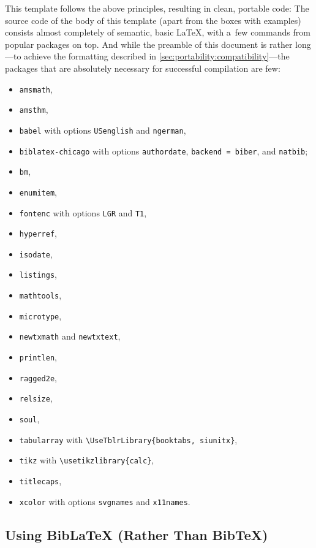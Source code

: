 \documentclass[11pt, a4paper, oneside]{article}
\theoremstyle{Plain}
\theoremstyle{Definition}
\theoremstyle{Remark}
\begin{document}
This template follows the above principles, resulting in clean, portable code: The source code of the body of this template (apart from the boxes with examples) consists almost completely of semantic, basic LaTeX,
with a~few commands from popular packages on top. And while the preamble of this document is rather long---to achieve the formatting described in \autoref{sec:portability:compatibility}---the packages that are absolutely necessary for successful compilation are few:
\begin{itemize}
	\item \verb|amsmath|,
	\item \verb|amsthm|,
	\item \verb|babel| with options \verb|USenglish| and \verb|ngerman|,
	\item \verb|biblatex-chicago| with options \verb|authordate|, \verb|backend = biber|, and \verb|natbib|;
	\item \verb|bm|,
	\item \verb|enumitem|,
	\item \verb|fontenc| with options \verb|LGR| and \verb|T1|,
	\item \verb|hyperref|,
	\item \verb|isodate|,
	\item \verb|listings|,
	\item \verb|mathtools|,
	\item \verb|microtype|,
	\item \verb|newtxmath| and \verb|newtxtext|,
	\item \verb|printlen|,
	\item \verb|ragged2e|,
	\item \verb|relsize|,
	\item \verb|soul|,
	\item \verb|tabularray| with \verb|\UseTblrLibrary{booktabs, siunitx}|,
	\item \verb|tikz| with \verb|\usetikzlibrary{calc}|,
	\item \verb|titlecaps|,
	\item \verb|xcolor| with options \verb|svgnames| and \verb|x11names|.
\end{itemize}

\subsection{Using BibLaTeX (Rather Than BibTeX)}
\end{document}
